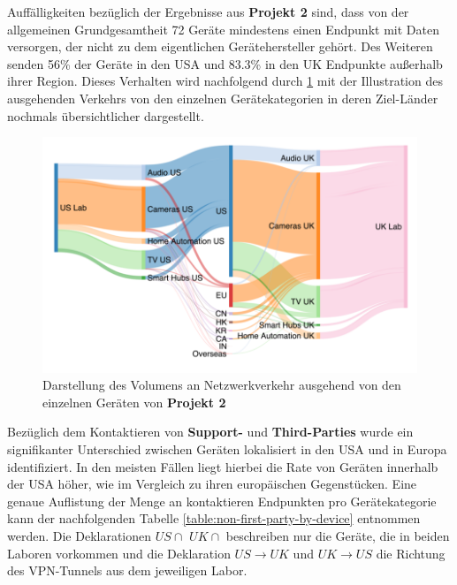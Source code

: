 \noindent Auffälligkeiten bezüglich der Ergebnisse aus \textbf{Projekt 2} sind, dass von der allgemeinen Grundgesamtheit 72 Geräte mindestens einen Endpunkt mit Daten versorgen, der nicht zu dem eigentlichen Gerätehersteller gehört. 
Des Weiteren senden 56\% der Geräte in den USA und 83.3\% in den UK Endpunkte außerhalb ihrer Region. Dieses Verhalten wird nachfolgend durch \ref{fig:traffic-flow} mit der Illustration des ausgehenden Verkehrs von den einzelnen Gerätekategorien in deren Ziel-Länder nochmals übersichtlicher dargestellt. 

\begin{figure}
    \centering
    \includegraphics[scale=0.3]{main/pictures/projekt_two/Traffic_Flow_Destinations}
    \caption{Darstellung des Volumens an Netzwerkverkehr ausgehend von den einzelnen Geräten von \textbf{Projekt 2} \cite{Ren2019}}
    \label{fig:traffic-flow}
\end{figure}

\noindent Bezüglich dem Kontaktieren von \textbf{Support-} und \textbf{Third-Parties} wurde ein signifikanter Unterschied zwischen Geräten lokalisiert in den USA und in Europa identifiziert. 
In den meisten Fällen liegt hierbei die Rate von Geräten innerhalb der USA höher, wie im Vergleich zu ihren europäischen Gegenstücken. Eine genaue Auflistung der Menge an kontaktieren Endpunkten pro Gerätekategorie kann der nachfolgenden Tabelle \ref{table:non-first-party-by-device} entnommen werden. 
Die Deklarationen $US\cap$ $UK\cap$ beschreiben nur die Geräte, die in beiden Laboren vorkommen und die Deklaration $US \rightarrow UK$ und $UK \rightarrow US$ die Richtung des VPN-Tunnels aus dem jeweiligen Labor. 

